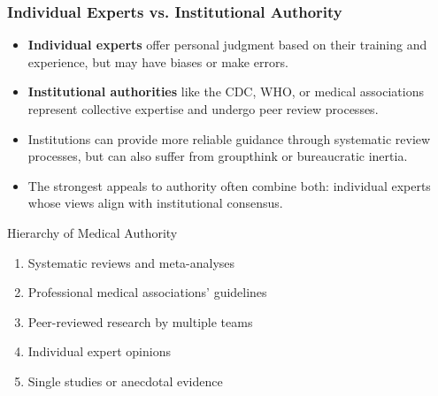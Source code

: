 \documentclass{beamer}
\begin{document}
	\begin{frame}
		\frametitle{Individual Experts vs. Institutional Authority}
		\begin{itemize}
			\item \textbf{Individual experts} offer personal judgment based on their training and experience, but may have biases or make errors.
			\item \textbf{Institutional authorities} like the CDC, WHO, or medical associations represent collective expertise and undergo peer review processes.
			\item Institutions can provide more reliable guidance through systematic review processes, but can also suffer from groupthink or bureaucratic inertia.
			\item The strongest appeals to authority often combine both: individual experts whose views align with institutional consensus.
		\end{itemize}
		
		\begin{block}{Hierarchy of Medical Authority}
			\begin{enumerate}
				\item Systematic reviews and meta-analyses
				\item Professional medical associations' guidelines
				\item Peer-reviewed research by multiple teams
				\item Individual expert opinions
				\item Single studies or anecdotal evidence
			\end{enumerate}
		\end{block}
	\end{frame}
	
\end{document}
